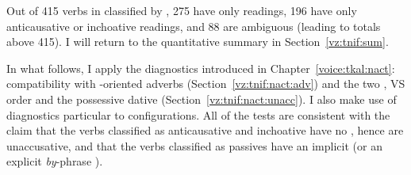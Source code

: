Out of 415 verbs in {\tnif} classified by \cite{ahdoutkastner19nels}, 275 have only  readings, 196 have only anticausative or inchoative readings, and 88 are ambiguous (leading to totals above 415). I will return to the quantitative summary in Section~\ref{vz:tnif:sum}.

In what follows, I apply the diagnostics introduced in Chapter~\ref{voice:tkal:nact}: compatibility with -oriented adverbs (Section~\ref{vz:tnif:nact:adv}) and the two , VS order and the possessive dative (Section~\ref{vz:tnif:nact:unacc}). I also make use of diagnostics particular to  configurations. All of the tests are consistent with the claim that the verbs classified as anticausative and inchoative have no , hence are unaccusative, and that the verbs classified as passives have an implicit  (or an explicit \emph{by}-phrase ).

